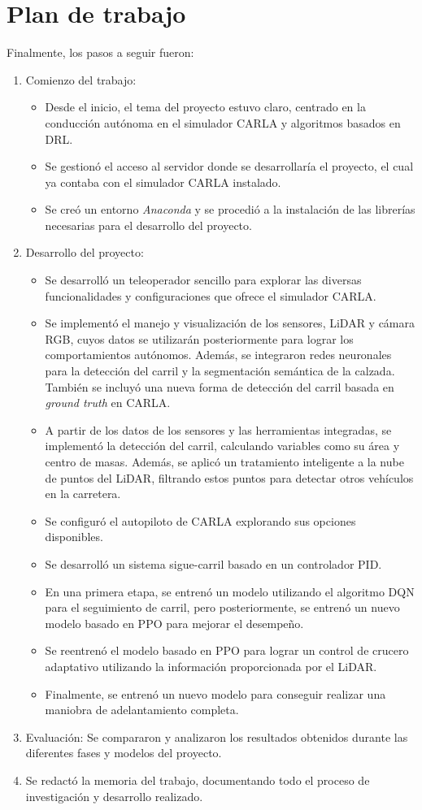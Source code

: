 \section{Plan de trabajo}
\label{sec:plantrabajo}

Finalmente, los pasos a seguir fueron:

\begin{enumerate}
\item Comienzo del trabajo:
\begin{itemize}
\item Desde el inicio, el tema del proyecto estuvo claro, centrado en la conducción autónoma en el simulador CARLA y algoritmos basados en \ac{DRL}.
\item Se gestionó el acceso al servidor donde se desarrollaría el proyecto, el cual ya contaba con el simulador CARLA instalado. 
\item Se creó un entorno \textit{Anaconda} y se procedió a la instalación de las librerías necesarias para el desarrollo del proyecto.
\end{itemize}

\item Desarrollo del proyecto:
\begin{itemize}
\item Se desarrolló un teleoperador sencillo para explorar las diversas funcionalidades y configuraciones que ofrece el simulador CARLA.
\item Se implementó el manejo y visualización de los sensores, \ac{LiDAR} y cámara RGB, cuyos datos se utilizarán posteriormente para lograr los comportamientos autónomos. Además, se integraron redes neuronales para la detección del carril y la segmentación semántica de la calzada. También se incluyó una nueva forma de detección del carril basada en \textit{ground truth} en CARLA. 
\item A partir de los datos de los sensores y las herramientas integradas, se implementó la detección del carril, calculando variables como su área y centro de masas. Además, se aplicó un tratamiento inteligente a la nube de puntos del \ac{LiDAR}, filtrando estos puntos para detectar otros vehículos en la carretera.
\item Se configuró el autopiloto de CARLA explorando sus opciones disponibles.
\item Se desarrolló un sistema sigue-carril basado en un controlador \ac{PID}.
\item En una primera etapa, se entrenó un modelo utilizando el algoritmo \ac{DQN} para el seguimiento de carril, pero posteriormente, se entrenó un nuevo modelo basado en \ac{PPO} para mejorar el desempeño.
\item Se reentrenó el modelo basado en \ac{PPO} para lograr un control de crucero adaptativo utilizando la información proporcionada por el \ac{LiDAR}.
\item Finalmente, se entrenó un nuevo modelo para conseguir realizar una maniobra de adelantamiento completa.
\end{itemize}

\item Evaluación: Se compararon y analizaron los resultados obtenidos durante las diferentes fases y modelos del proyecto.
\item Se redactó la memoria del trabajo, documentando todo el proceso de investigación y desarrollo realizado.
\end{enumerate}

